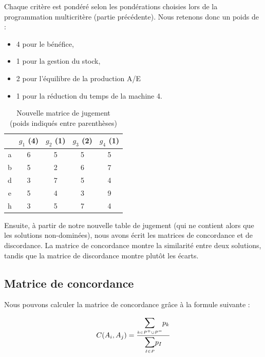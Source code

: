 \documentclass[paper=a4, fontsize=11pt]{report}
\numberwithin{equation}{section}		%
\numberwithin{figure}{section}			%
\numberwithin{table}{section}				%
\begin{document}
Chaque critère est pondéré selon les pondérations choisies lors de la programmation multicritère (partie précédente). 
Nous retenons donc un poids de :\\

\begin{itemize}
\item 4 pour le bénéfice,
\item 1 pour la gestion du stock,
\item 2 pour l’équilibre de la production A/E
\item 1 pour la réduction du temps de la machine 4.\\
\end{itemize}


\begin{table}[H]
\begin{center}
\begin{tabular}{c|cccc}
 & $g_1$ (4) & $g_2$ (1) & $g_3$ (2) & $g_4$ (1) \\ 
\hline 
a & 6 & 5 & 5 & 5 \\ 
b & 5 & 2 & 6 & 7 \\ 
d & 3 & 7 & 5 & 4 \\ 
e & 5 & 4 & 3 & 9 \\ 
h & 3 & 5 & 7 & 4 \\ 
\end{tabular} 
\caption{Nouvelle matrice de jugement\\ 
(poids indiqués entre parenthèses)} 
\end{center}
\end{table}


Ensuite, à partir de notre nouvelle table de jugement (qui ne contient alors que les solutions non-dominées), nous avons écrit les matrices de concordance et de discordance. La matrice de concordance montre la similarité entre deux solutions, tandis que la matrice de discordance montre plutôt les écarts.\\

\subsection{Matrice de concordance}

Nous pouvons calculer la matrice de concordance grâce à la formule suivante :

\begin{equation*}
C(A_i, A_j) = \frac{\mathlarger{\mathlarger{\sum}}\limits_{\mathsmaller{k \in P^+ \cup P^=}} p_k}{\mathlarger{\mathlarger{\sum}}\limits_{\mathsmaller{I \in P}} p_I}
\end{equation*} 
\end{document}
